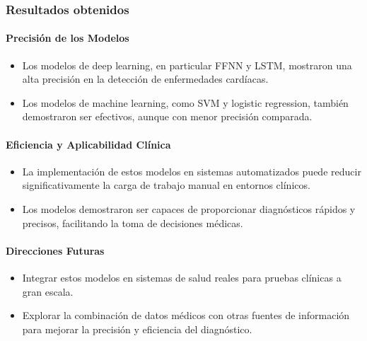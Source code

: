 \subsubsection{Resultados obtenidos}

\paragraph{Precisión de los Modelos}

\begin{itemize}
\item Los modelos de deep learning, en particular FFNN y LSTM, mostraron una alta precisión en la detección de enfermedades cardíacas.
\item Los modelos de machine learning, como SVM y logistic regression, también demostraron ser efectivos, aunque con menor precisión comparada.
\end{itemize}

\paragraph{Eficiencia y Aplicabilidad Clínica}

\begin{itemize}
\item La implementación de estos modelos en sistemas automatizados puede reducir significativamente la carga de trabajo manual en entornos clínicos.
\item Los modelos demostraron ser capaces de proporcionar diagnósticos rápidos y precisos, facilitando la toma de decisiones médicas.
\end{itemize}

\paragraph{Direcciones Futuras}

\begin{itemize}
\item Integrar estos modelos en sistemas de salud reales para pruebas clínicas a gran escala.
\item Explorar la combinación de datos médicos con otras fuentes de información para mejorar la precisión y eficiencia del diagnóstico.
\end{itemize}

